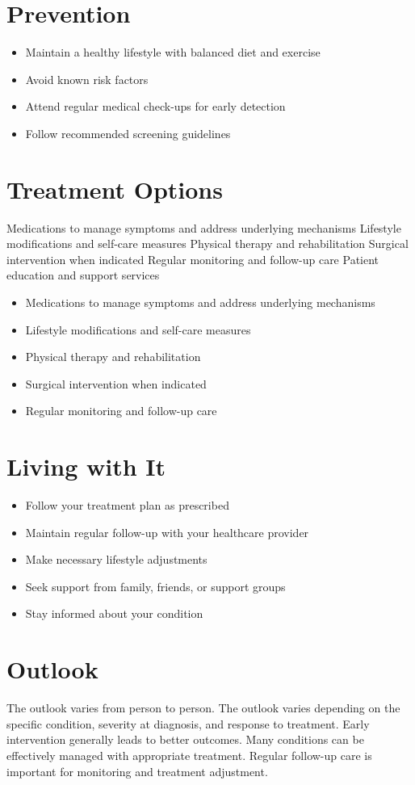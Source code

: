 \section{Prevention}
\begin{itemize}[noitemsep]
  \item Maintain a healthy lifestyle with balanced diet and exercise
  \item Avoid known risk factors
  \item Attend regular medical check-ups for early detection
  \item Follow recommended screening guidelines
\end{itemize}
\section{Treatment Options}
Medications to manage symptoms and address underlying mechanisms Lifestyle modifications and self-care measures Physical therapy and rehabilitation Surgical intervention when indicated Regular monitoring and follow-up care Patient education and support services

\begin{itemize}[noitemsep]
  \item Medications to manage symptoms and address underlying mechanisms
  \item Lifestyle modifications and self-care measures
  \item Physical therapy and rehabilitation
  \item Surgical intervention when indicated
  \item Regular monitoring and follow-up care
\end{itemize}
\section{Living with It}
\begin{itemize}[noitemsep]
  \item Follow your treatment plan as prescribed
  \item Maintain regular follow-up with your healthcare provider
  \item Make necessary lifestyle adjustments
  \item Seek support from family, friends, or support groups
  \item Stay informed about your condition
\end{itemize}
\section{Outlook}
The outlook varies from person to person. The outlook varies depending on the specific condition, severity at diagnosis, and response to treatment. Early intervention generally leads to better outcomes. Many conditions can be effectively managed with appropriate treatment. Regular follow-up care is important for monitoring and treatment adjustment.

